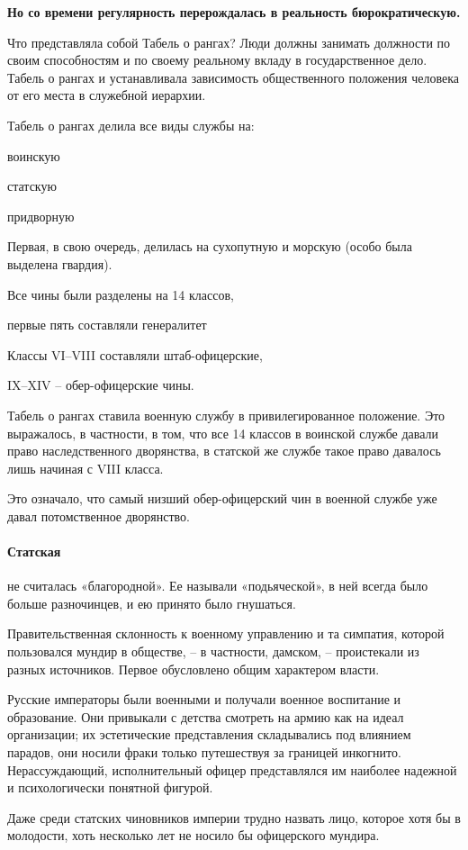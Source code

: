 \documentclass[12pt,a4paper]{article}
\begin{document}
\textbf{Но со времени регулярность перерождалась в реальность
бюрократическую.}

Что представляла собой Табель о рангах?  Люди должны занимать должности по своим способностям и по своему реальному вкладу в государственное дело.
Табель о рангах и устанавливала зависимость
общественного положения человека от его места
в служебной иерархии.
 
Табель о рангах делила все виды службы на:

воинскую
 
статскую

придворную

Первая, в свою очередь, делилась
на сухопутную и морскую (особо была выделена гвардия).

Все чины были разделены на 14 классов,

первые пять составляли генералитет

Классы VI–VIII составляли штаб-офицерские,

IX–XIV – обер-офицерские чины.

Табель о рангах ставила военную службу
в привилегированное положение. Это выражалось,
в частности, в том, что все 14 классов в воинской службе
давали право наследственного дворянства, в статской же
службе такое право давалось лишь начиная с VIII класса.

Это означало, что самый низший обер-офицерский чин
в военной службе уже давал потомственное дворянство.
 
\paragraph{Статская} не считалась «благородной».
Ее называли «подьяческой», в ней всегда было больше
разночинцев, и ею принято было гнушаться.

Правительственная склонность к военному
управлению и та симпатия, которой пользовался мундир
в обществе, – в частности, дамском, – проистекали из разных
источников. Первое обусловлено общим характером власти.

Русские императоры были военными и получали военное
воспитание и образование. Они привыкали с детства
смотреть на армию как на идеал организации; их
эстетические представления складывались под влиянием
парадов, они носили фраки только путешествуя за границей
инкогнито. Нерассуждающий, исполнительный офицер
представлялся им наиболее надежной и психологически
понятной фигурой.

Даже среди статских чиновников
империи трудно назвать лицо, которое хотя бы в молодости,
хоть несколько лет не носило бы офицерского мундира.
\end{document}
